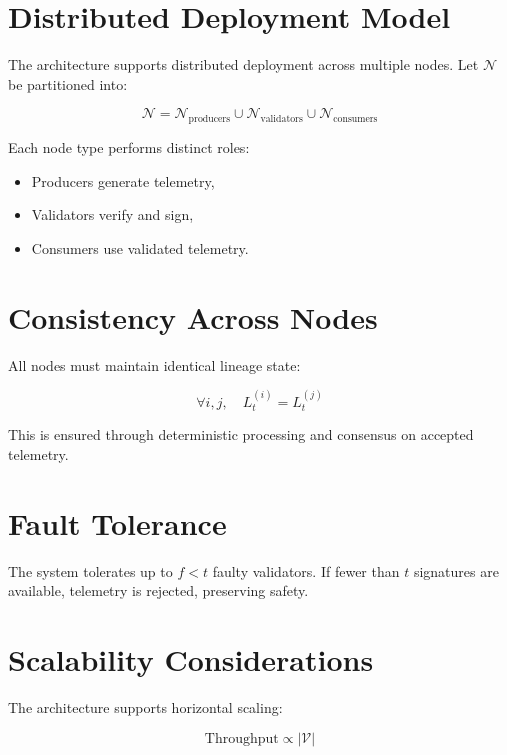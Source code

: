 \section{Distributed Deployment Model}

The architecture supports distributed deployment across multiple nodes. Let $\mathcal{N}$ be partitioned into:

\begin{equation}
\mathcal{N} = \mathcal{N}_{\text{producers}} \cup \mathcal{N}_{\text{validators}} \cup \mathcal{N}_{\text{consumers}}
\end{equation}

Each node type performs distinct roles:

\begin{itemize}
\item Producers generate telemetry,
\item Validators verify and sign,
\item Consumers use validated telemetry.
\end{itemize}

\section{Consistency Across Nodes}

All nodes must maintain identical lineage state:

\begin{equation}
\forall i,j, \quad L_t^{(i)} = L_t^{(j)}
\end{equation}

This is ensured through deterministic processing and consensus on accepted telemetry.

\section{Fault Tolerance}

The system tolerates up to $f < t$ faulty validators. If fewer than $t$ signatures are available, telemetry is rejected, preserving safety.

\section{Scalability Considerations}

The architecture supports horizontal scaling:

\begin{equation}
\text{Throughput} \propto |\mathcal{V}|
\end{equation}

